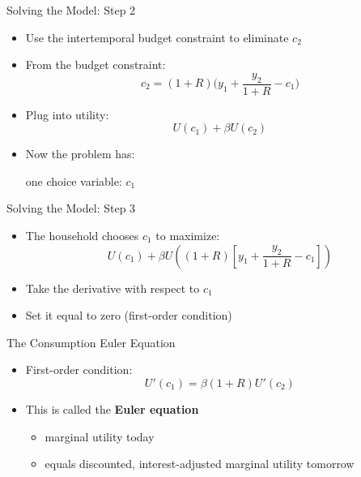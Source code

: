 \documentclass[10pt,aspectratio=169]{beamer}
\begin{document}
\begin{frame}{Solving the Model: Step 2}

\begin{itemize}
    \item Use the intertemporal budget constraint to eliminate \(c_2\)
    \vspace{0.3cm}

    \item From the budget constraint:
    \[
    c_2 = (1+R)\big(y_1 + \frac{y_2}{1+R} - c_1\big)
    \]
    \item Plug into utility:
    \[
    U(c_1) + \beta U(c_2)
    \]
    \item Now the problem has:
    \begin{itemize}
        \itemvso one choice variable: \(c_1\)
    \end{itemize}
\end{itemize}

\end{frame}


\begin{frame}{Solving the Model: Step 3}

\begin{itemize}
    \item The household chooses \(c_1\) to maximize:
    \[
    U(c_1)
    +
    \beta U\!\left(
    (1+R)\left[y_1 + \frac{y_2}{1+R} - c_1\right]
    \right)
    \]
    \vspace{0.3cm}

    \item Take the derivative with respect to \(c_1\)
    \vspace{0.3cm}

    \item Set it equal to zero (first-order condition)
\end{itemize}

\end{frame}

\begin{frame}{The Consumption Euler Equation}

\begin{itemize}
    \item First-order condition:
    \[
    U'(c_1)
    =
    \beta (1+R) U'(c_2)
    \]
    \vspace{0.3cm}

    \item This is called the \textbf{Euler equation}
    \vspace{0.3cm}
    \begin{itemize}
        \item marginal utility today
        \item equals discounted, interest-adjusted marginal utility tomorrow
    \end{itemize}
\end{itemize}

\end{frame}
\end{document}
